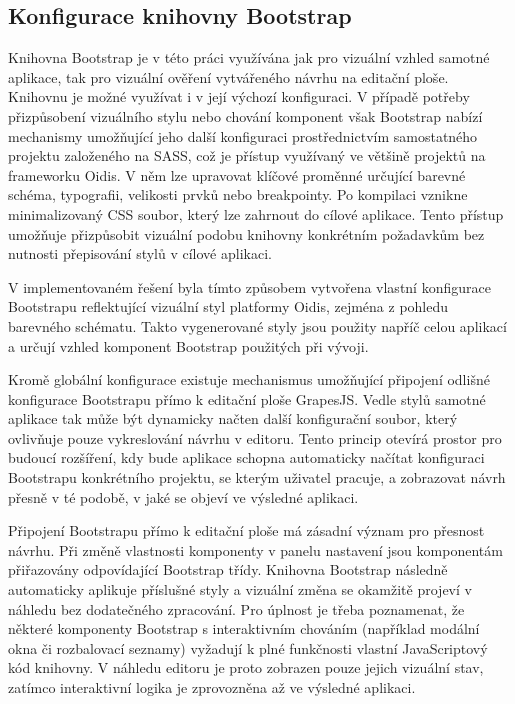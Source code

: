 \subsection{Konfigurace knihovny Bootstrap}
Knihovna Bootstrap je v této práci využívána jak pro vizuální vzhled samotné aplikace, tak pro vizuální ověření vytvářeného návrhu na editační ploše. Knihovnu je možné využívat i v její výchozí konfiguraci. V případě potřeby přizpůsobení vizuálního stylu nebo chování komponent však Bootstrap nabízí mechanismy umožňující jeho další konfiguraci prostřednictvím samostatného projektu založeného na SASS, což je přístup využívaný ve většině projektů na frameworku Oidis. V něm lze upravovat klíčové proměnné určující barevné schéma, typografii, velikosti prvků nebo breakpointy. Po kompilaci vznikne minimalizovaný CSS soubor, který lze zahrnout do cílové aplikace. Tento přístup umožňuje přizpůsobit vizuální podobu knihovny konkrétním požadavkům bez nutnosti přepisování stylů v cílové aplikaci.

V implementovaném řešení byla tímto způsobem vytvořena vlastní 
konfigurace Bootstrapu reflektující vizuální styl platformy Oidis, zejména z pohledu barevného schématu. Takto vygenerované styly jsou použity napříč celou aplikací a určují vzhled komponent Bootstrap použitých při vývoji.

Kromě globální konfigurace existuje mechanismus umožňující připojení odlišné konfigurace Bootstrapu přímo k editační ploše GrapesJS. Vedle stylů samotné aplikace tak může být dynamicky načten další konfigurační soubor, který ovlivňuje pouze vykreslování návrhu v editoru. Tento princip otevírá prostor pro budoucí rozšíření, kdy bude aplikace schopna automaticky načítat konfiguraci Bootstrapu konkrétního projektu, se kterým uživatel pracuje, a zobrazovat návrh přesně v té podobě, v jaké se objeví ve výsledné aplikaci.

Připojení Bootstrapu přímo k editační ploše má zásadní význam pro 
přesnost návrhu. Při změně vlastnosti komponenty v panelu nastavení jsou komponentám přiřazovány odpovídající Bootstrap třídy. Knihovna Bootstrap následně automaticky aplikuje příslušné styly a vizuální změna se okamžitě projeví v náhledu bez dodatečného zpracování. Pro úplnost je třeba poznamenat, že některé komponenty Bootstrap s interaktivním chováním (například modální okna či rozbalovací seznamy) vyžadují k plné funkčnosti vlastní JavaScriptový kód knihovny. V náhledu editoru je proto zobrazen pouze jejich vizuální stav, zatímco interaktivní logika je zprovozněna až ve výsledné aplikaci.

